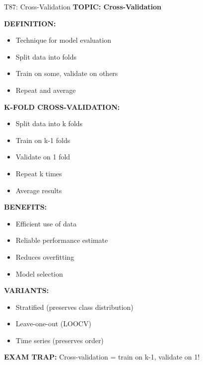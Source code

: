 \documentclass[8pt]{beamer}
\begin{document}
	\begin{frame}{T87: Cross-Validation}
		\fontsize{6.5}{7.5}\selectfont
		\textbf{TOPIC: Cross-Validation}
		
		\vspace{0.1cm}
		\textbf{DEFINITION:}
		\begin{itemize}
			\item Technique for model evaluation
			\item Split data into folds
			\item Train on some, validate on others
			\item Repeat and average
		\end{itemize}
		
		\vspace{0.1cm}
		\textbf{K-FOLD CROSS-VALIDATION:}
		\begin{itemize}
			\item Split data into k folds
			\item Train on k-1 folds
			\item Validate on 1 fold
			\item Repeat k times
			\item Average results
		\end{itemize}
		
		\vspace{0.1cm}
		\textbf{BENEFITS:}
		\begin{itemize}
			\item Efficient use of data
			\item Reliable performance estimate
			\item Reduces overfitting
			\item Model selection
		\end{itemize}
		
		\vspace{0.1cm}
		\textbf{VARIANTS:}
		\begin{itemize}
			\item Stratified (preserves class distribution)
			\item Leave-one-out (LOOCV)
			\item Time series (preserves order)
		\end{itemize}
		
		\textcolor{myred}{\textbf{EXAM TRAP:}} Cross-validation = \textcolor{myblue}{train on k-1, validate on 1}!
	\end{frame}
	
\end{document}
